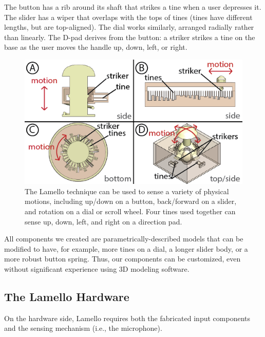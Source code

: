         The button has a rib around its shaft that strikes a tine when a user depresses it. The slider has a wiper that overlaps with the tops of tines (tines have different lengths, but are top-aligned). The dial works similarly, arranged radially rather than linearly. The D-pad derives from the button: a striker strikes a tine on the base as the user moves the handle up, down, left, or right.
        
        \begin{figure}
  \centering
    \includegraphics[width=\textwidth]{figures/lamello/component-schematics.png}
  \caption{The Lamello technique can be used to sense a variety of physical motions, including up/down on a button, back/forward on a slider, and rotation on a dial or scroll wheel. Four tines used together can sense up, down, left, and right on a direction pad. %
  }
  \label{fig:lamello-allcomponents}
\end{figure}

        All components we created are parametrically-described models that can be modified to have, for example, more tines on a dial, a longer slider body, or a more robust button spring. Thus, our components can be customized, even without significant experience using 3D modeling software.

    \subsection{The Lamello Hardware}
    
    On the hardware side, Lamello requires both the fabricated input components and the sensing mechanism (i.e., the microphone).
    
